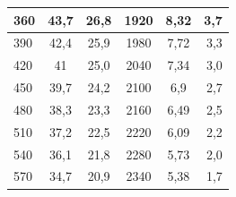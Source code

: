 \documentclass[10pt, twoside]{article}
\begin{document}
\begin{minipage}{\textwidth}
\begin{tabular}{|l|c|c|c|c|r|}
        360	&	43,7	&	26,8	&	1920	&	8,32	&	3,7	\\ \hline
        390	&	42,4	&	25,9	&	1980	&	7,72	&	3,3	\\ \hline
        420	&	41	&	25,0	&	2040	&	7,34	&	3,0	\\ \hline
        450	&	39,7	&	24,2	&	2100	&	6,9	&	2,7	\\ \hline
        480	&	38,3	&	23,3	&	2160	&	6,49	&	2,5	\\ \hline
        510	&	37,2	&	22,5	&	2220	&	6,09	&	2,2	\\ \hline
        540	&	36,1	&	21,8	&	2280	&	5,73	&	2,0	\\ \hline
        570	&	34,7	&	20,9	&	2340	&	5,38	&	1,7	\\ \hline
    \end{tabular}
\end{minipage}
\end{document}
